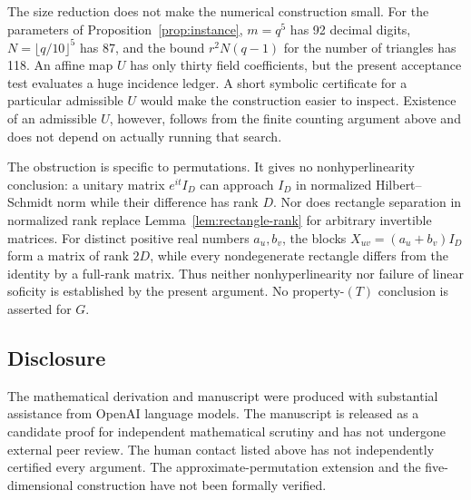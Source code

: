 \documentclass[11pt]{amsart}
\theoremstyle{definition}
\theoremstyle{remark}
\numberwithin{equation}{section}
\begin{document}
The size reduction does not make the numerical construction small.
For the parameters of Proposition~\ref{prop:instance}, $m=q^5$ has 92 decimal digits,
$N=\lfloor q/10\rfloor^5$ has 87, and the bound
$r^2N(q-1)$ for the number of triangles has 118. An affine map $U$
has only thirty field coefficients, but the present acceptance
test evaluates a huge incidence ledger. A short symbolic
certificate for a particular admissible $U$ would make the
construction easier to inspect. Existence of an admissible $U$,
however, follows from the finite counting argument above and does
not depend on actually running that search.

The obstruction is specific to permutations. It gives no
nonhyperlinearity conclusion: a unitary matrix $e^{it}I_D$ can
approach $I_D$ in normalized Hilbert--Schmidt norm while their
difference has rank $D$. Nor does rectangle separation in normalized
rank replace Lemma~\ref{lem:rectangle-rank} for arbitrary
invertible matrices. For distinct positive real numbers $a_u,b_v$,
the blocks $X_{uv}=(a_u+b_v)I_D$ form a matrix of rank $2D$, while
every nondegenerate rectangle differs from the identity by a
full-rank matrix. Thus neither nonhyperlinearity nor failure of
linear soficity is established by the present argument.
No property-$(T)$ conclusion is asserted for $G$.

\subsection*{Disclosure}
The mathematical derivation and manuscript were produced with
substantial assistance from OpenAI language models. The manuscript
is released as a candidate proof for independent mathematical
scrutiny and has not undergone external peer review. The human
contact listed above has not independently certified every argument.
The approximate-permutation extension and the five-dimensional
construction have not been formally verified.
\end{document}
